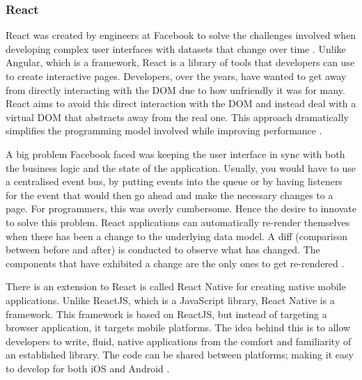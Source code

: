 \subsubsection{React} 
React was created by engineers at Facebook to solve the challenges involved when developing complex user interfaces with datasets that change over time \cite{gackenheimer2015introduction}. 
Unlike Angular, which is a framework, React is a library of tools that developers can use to create interactive pages.
Developers, over the years, have wanted to get away from directly interacting with the DOM due to how unfriendly it was for many.
React aims to avoid this direct interaction with the DOM and instead deal with a virtual DOM that abstracts away from
the real one. This approach dramatically simplifies the programming model involved while improving performance \cite{staff2016react}.

A big problem Facebook faced was keeping the user interface in sync with both the business logic and the state of the application.
Usually, you would have to use a centralised event bus, by putting events into the queue or by having listeners for the event that would then go
ahead and make the necessary changes to a page. 
For programmers, this was overly cumbersome. Hence the desire to innovate to solve this problem.
React applications can automatically re-render themselves when there has been a change to the underlying data model.
A diff (comparison between before and after) is conducted to observe what has changed. The components that have exhibited a change are the
only ones to get re-rendered \cite{staff2016react}.
 
There is an extension to React is called React Native for creating native mobile applications. Unlike ReactJS, which is a JavaScript library,
React Native is a framework. 
This framework is based on ReactJS, but instead of targeting a browser application, it targets mobile platforms.
The idea behind this is to allow developers to write, fluid, native applications from the comfort and familiarity of an established library.
The code can be shared between platforms; making it easy to develop for both iOS and Android \cite{eisenman2015learning}.


